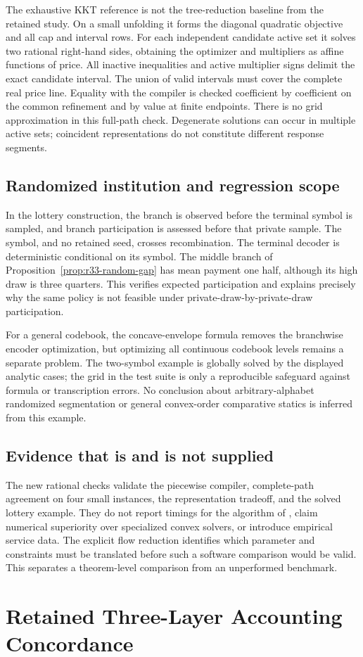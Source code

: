The exhaustive KKT reference is not the tree-reduction baseline from the retained study. On a small unfolding it forms the diagonal quadratic objective and all cap and interval rows. For each independent candidate active set it solves two rational right-hand sides, obtaining the optimizer and multipliers as affine functions of price. All inactive inequalities and active multiplier signs delimit the exact candidate interval. The union of valid intervals must cover the complete real price line. Equality with the compiler is checked coefficient by coefficient on the common refinement and by value at finite endpoints. There is no grid approximation in this full-path check. Degenerate solutions can occur in multiple active sets; coincident representations do not constitute different response segments.

\subsection{Randomized institution and regression scope}
In the lottery construction, the branch is observed before the terminal symbol is sampled, and branch participation is assessed before that private sample. The symbol, and no retained seed, crosses recombination. The terminal decoder is deterministic conditional on its symbol. The middle branch of Proposition~\ref{prop:r33-random-gap} has mean payment one half, although its high draw is three quarters. This verifies expected participation and explains precisely why the same policy is not feasible under private-draw-by-private-draw participation.

For a general codebook, the concave-envelope formula removes the branchwise encoder optimization, but optimizing all continuous codebook levels remains a separate problem. The two-symbol example is globally solved by the displayed analytic cases; the grid in the test suite is only a reproducible safeguard against formula or transcription errors. No conclusion about arbitrary-alphabet randomized segmentation or general convex-order comparative statics is inferred from this example.

\subsection{Evidence that is and is not supplied}
The new rational checks validate the piecewise compiler, complete-path agreement on four small instances, the representation tradeoff, and the solved lottery example. They do not report timings for the algorithm of \citet{KlimmWarode2021}, claim numerical superiority over specialized convex solvers, or introduce empirical service data. The explicit flow reduction identifies which parameter and constraints must be translated before such a software comparison would be valid. This separates a theorem-level comparison from an unperformed benchmark.

\section{Retained Three-Layer Accounting Concordance}
